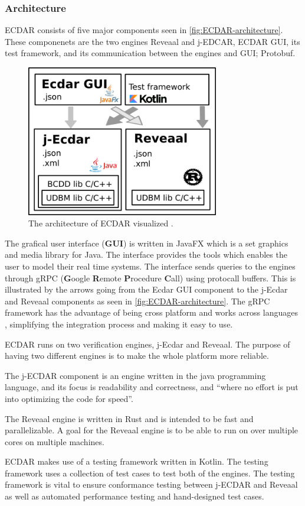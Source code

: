 \subsubsection{Architecture}
ECDAR consists of five major components seen in \autoref{fig:ECDAR-architecture}.
These componenets are the two engines Reveaal and j-EDCAR, ECDAR GUI, its test framework, and its communication between the engines and GUI; Protobuf.
\begin{figure}[H]
    \centering
    \includegraphics[width=0.75\textwidth]{common/figures/ArchOverview.png}
    \caption{The architecture of ECDAR visualized \cite{ECDARNET}.}
    \label{fig:ECDAR-architecture}
\end{figure}
The grafical user interface (\textbf{GUI}) is written in JavaFX which is a set graphics and media library for Java. The interface provides the tools which enables the user to model their real time systems. The interface sends queries to the engines through gRPC (\textbf{G}oogle \textbf{R}emote \textbf{P}rocedure \textbf{C}all) using protocall buffers. This is illustrated by the arrows going from the Ecdar GUI component to the j-Ecdar and Reveaal components as seen in \autoref{fig:ECDAR-architecture}. The gRPC framework has the advantage of being cross platform and works across languages \cite{gRPC}, simplifying the integration process and making it easy to use.

ECDAR runs on two verification engines, j-Ecdar and Reveaal. The purpose of having two different engines is to make the whole platform more reliable.

The j-ECDAR component is an engine written in the java programming language, and its focus is readability and correctness, and ``where no effort is put into optimizing the code for speed''.\cite{ECDARNET} %

The Reveaal engine is written in Rust and is intended to be fast and parallelizable. A goal for the Reveaal engine is to be able to run on over multiple cores on multiple machines. 

ECDAR makes use of a testing framework written in Kotlin. The testing framework uses a collection of test cases to test both of the engines. The testing framework is vital to ensure conformance testing between j-ECDAR and Reveaal as well as automated performance testing and hand-designed test cases. 